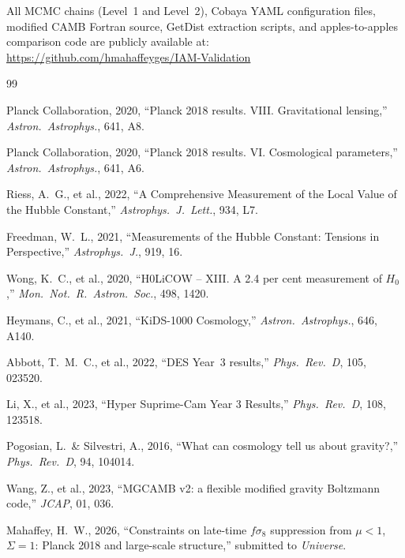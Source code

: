 \documentclass[11pt]{article}
\begin{document}
All MCMC chains (Level~1 and Level~2), Cobaya YAML configuration
files, modified CAMB Fortran source, GetDist extraction scripts, and
apples-to-apples comparison code are publicly available at:
\url{https://github.com/hmahaffeyges/IAM-Validation}



\FloatBarrier
\begin{thebibliography}{99}

Planck Collaboration, 2020, ``Planck 2018 results. VIII. Gravitational
lensing,'' \textit{Astron.\ Astrophys.}, 641, A8.

Planck Collaboration, 2020, ``Planck 2018 results. VI. Cosmological
parameters,'' \textit{Astron.\ Astrophys.}, 641, A6.

Riess, A.~G., et al., 2022, ``A Comprehensive Measurement of the Local
Value of the Hubble Constant,'' \textit{Astrophys.\ J.\ Lett.}, 934, L7.

Freedman, W.~L., 2021, ``Measurements of the Hubble Constant: Tensions
in Perspective,'' \textit{Astrophys.\ J.}, 919, 16.

Wong, K.~C., et al., 2020, ``H0LiCOW -- XIII. A 2.4 per cent
measurement of $H_0$,'' \textit{Mon.\ Not.\ R.\ Astron.\ Soc.}, 498,
1420.

Heymans, C., et al., 2021, ``KiDS-1000 Cosmology,'' \textit{Astron.\
Astrophys.}, 646, A140.

Abbott, T.~M.~C., et al., 2022, ``DES Year~3 results,'' \textit{Phys.\
Rev.\ D}, 105, 023520.

Li, X., et al., 2023, ``Hyper Suprime-Cam Year 3 Results,''
\textit{Phys.\ Rev.\ D}, 108, 123518.

Pogosian, L.\ \& Silvestri, A., 2016, ``What can cosmology tell us
about gravity?,'' \textit{Phys.\ Rev.\ D}, 94, 104014.

Wang, Z., et al., 2023, ``MGCAMB v2: a flexible modified gravity
Boltzmann code,'' \textit{JCAP}, 01, 036.

Mahaffey, H.~W., 2026, ``Constraints on late-time $f\sigma_8$
suppression from $\mu < 1$, $\Sigma = 1$: Planck 2018 and large-scale
structure,'' submitted to \textit{Universe}.


\end{thebibliography}
\end{document}
